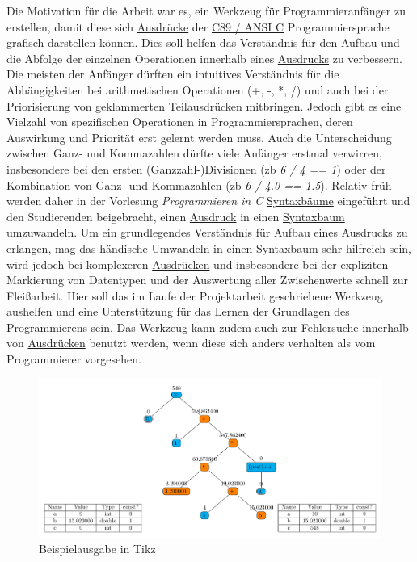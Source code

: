 \documentclass[oneside]{ausarbeitung}
\begin{document}
Die Motivation für die Arbeit war es, ein Werkzeug für Programmieranfänger zu erstellen, damit diese sich \hyperref[sub:expression]{Ausdrücke} der \hyperref[sub:c89]{C89 / ANSI C} Programmiersprache grafisch darstellen können. Dies soll helfen das Verständnis für den Aufbau und die Abfolge der einzelnen Operationen innerhalb eines \hyperref[sub:expression]{Ausdrucks} zu verbessern. Die meisten der Anfänger dürften ein intuitives Verständnis für die Abhängigkeiten bei arithmetischen Operationen (+, -, *, /) und auch bei der Priorisierung von geklammerten Teilausdrücken mitbringen. Jedoch gibt es eine Vielzahl von spezifischen Operationen in Programmiersprachen, deren Auswirkung und Priorität erst gelernt werden muss. Auch die Unterscheidung zwischen Ganz- und Kommazahlen dürfte viele Anfänger erstmal verwirren, insbesondere bei den ersten (Ganzzahl-)Divisionen (\ac{zb} \textit{6 / 4 == 1}) oder der Kombination von Ganz- und Kommazahlen (\ac{zb} \textit{6 / 4.0 == 1.5}). Relativ früh werden daher in der Vorlesung \textit{Programmieren in C} \hyperref[sub:syntax_tree]{Syntaxbäume} eingeführt und den Studierenden beigebracht, einen \hyperref[sub:expression]{Ausdruck} in einen \hyperref[sub:syntax_tree]{Syntaxbaum} umzuwandeln. Um ein grundlegendes Verständnis für Aufbau eines Ausdrucks zu erlangen, mag das händische Umwandeln in einen \hyperref[sub:syntax_tree]{Syntaxbaum} sehr hilfreich sein, wird jedoch bei komplexeren \hyperref[sub:expression]{Ausdrücken} und insbesondere bei der expliziten Markierung von Datentypen und der Auswertung aller Zwischenwerte schnell zur Fleißarbeit. Hier soll das im Laufe der Projektarbeit geschriebene Werkzeug aushelfen und eine Unterstützung für das Lernen der Grundlagen des Programmierens sein. Das Werkzeug kann zudem auch zur Fehlersuche innerhalb von \hyperref[sub:expression]{Ausdrücken} benutzt werden, wenn diese sich anders verhalten als vom Programmierer vorgesehen.

\begin{figure}[htbp]
  \centering
  \includegraphics[width=0.8\textheight]{images/tree.pdf}
  \caption{Beispielausgabe in Tikz}
  \label{fig:motivation}
\end{figure}
\end{document}

